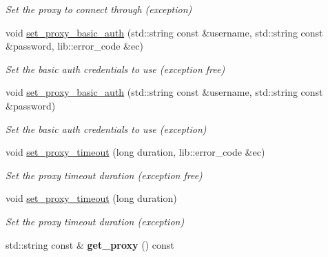 \begin{DoxyCompactItemize}
\begin{DoxyCompactList}\small\item\em Set the proxy to connect through (exception) \end{DoxyCompactList}\item 
void \hyperlink{classwebsocketpp_1_1transport_1_1asio_1_1connection_a99ee9d4f4043a2e3b2225cb1f03a56d1}{set\+\_\+proxy\+\_\+basic\+\_\+auth} (std\+::string const \&username, std\+::string const \&password, lib\+::error\+\_\+code \&ec)
\begin{DoxyCompactList}\small\item\em Set the basic auth credentials to use (exception free) \end{DoxyCompactList}\item 
void \hyperlink{classwebsocketpp_1_1transport_1_1asio_1_1connection_a0a42cbcc12974d71c0ea91d12da6b72e}{set\+\_\+proxy\+\_\+basic\+\_\+auth} (std\+::string const \&username, std\+::string const \&password)\hypertarget{classwebsocketpp_1_1transport_1_1asio_1_1connection_a0a42cbcc12974d71c0ea91d12da6b72e}{}\label{classwebsocketpp_1_1transport_1_1asio_1_1connection_a0a42cbcc12974d71c0ea91d12da6b72e}

\begin{DoxyCompactList}\small\item\em Set the basic auth credentials to use (exception) \end{DoxyCompactList}\item 
void \hyperlink{classwebsocketpp_1_1transport_1_1asio_1_1connection_a1617e51dd915164bd80d0a24b19e7763}{set\+\_\+proxy\+\_\+timeout} (long duration, lib\+::error\+\_\+code \&ec)
\begin{DoxyCompactList}\small\item\em Set the proxy timeout duration (exception free) \end{DoxyCompactList}\item 
void \hyperlink{classwebsocketpp_1_1transport_1_1asio_1_1connection_a01368cd677c09dfb7e47261180ebba82}{set\+\_\+proxy\+\_\+timeout} (long duration)\hypertarget{classwebsocketpp_1_1transport_1_1asio_1_1connection_a01368cd677c09dfb7e47261180ebba82}{}\label{classwebsocketpp_1_1transport_1_1asio_1_1connection_a01368cd677c09dfb7e47261180ebba82}

\begin{DoxyCompactList}\small\item\em Set the proxy timeout duration (exception) \end{DoxyCompactList}\item 
std\+::string const  \& {\bfseries get\+\_\+proxy} () const\hypertarget{classwebsocketpp_1_1transport_1_1asio_1_1connection_a302c81fe0bb6fd86b8860109adc363c7}{}\label{classwebsocketpp_1_1transport_1_1asio_1_1connection_a302c81fe0bb6fd86b8860109adc363c7}


\end{DoxyCompactItemize}
